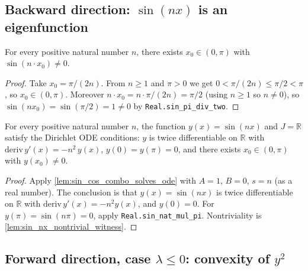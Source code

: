 \subsection{Backward direction: $\sin(nx)$ is an eigenfunction}

\begin{lemma}
    \label{lem:sin_nx_nontrivial_witness}
    \leanok
    For every positive natural number $n$, there exists $x_0 \in (0,\pi)$ with
    $\sin(n \cdot x_0) \ne 0$.
\end{lemma}
\begin{proof}
    Take $x_0 = \pi/(2n)$. From $n \ge 1$ and $\pi > 0$ we get $0 < \pi/(2n)
    \le \pi/2 < \pi$, so $x_0 \in (0,\pi)$. Moreover
    $n \cdot x_0 = n \cdot \pi/(2n) = \pi/2$ (using $n \ge 1$ so $n \neq 0$), so
    $\sin(n x_0) = \sin(\pi/2) = 1 \neq 0$ by \texttt{Real.sin\_pi\_div\_two}.
\end{proof}

\begin{lemma}
    \label{lem:sin_eigenfunction}
    \leanok
    For every positive natural number $n$, the function $y(x) = \sin(nx)$ and
    $J = \mathbb{R}$ satisfy the Dirichlet ODE conditions: $y$ is twice
    differentiable on $\mathbb{R}$ with $\mathrm{deriv}\, y'(x) = -n^2 \, y(x)$,
    $y(0) = y(\pi) = 0$, and there exists $x_0 \in (0,\pi)$ with $y(x_0) \neq 0$.
\end{lemma}
\begin{proof}
    Apply \cref{lem:sin_cos_combo_solves_ode} with $A = 1$, $B = 0$, $s = n$
    (as a real number). The conclusion is that $y(x) = \sin(nx)$ is twice
    differentiable on $\mathbb{R}$ with $\mathrm{deriv}\, y'(x) = -n^2 y(x)$, and
    $y(0) = 0$. For $y(\pi) = \sin(n\pi) = 0$, apply \texttt{Real.sin\_nat\_mul\_pi}.
    Nontriviality is \cref{lem:sin_nx_nontrivial_witness}.
\end{proof}

\subsection{Forward direction, case $\lambda \le 0$: convexity of $y^2$}

